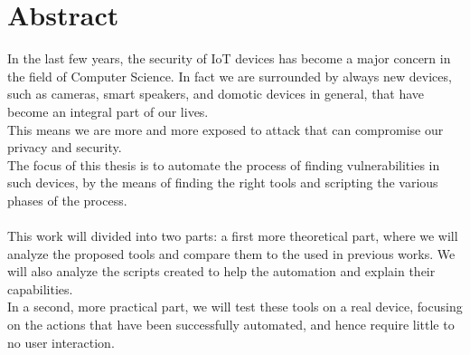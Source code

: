 \chapter*{Abstract} %
\label{abtract}


In the last few years, the security of IoT devices has become a major concern
in the field of Computer Science. In fact we are surrounded by always
new devices, such as cameras, smart speakers, and domotic devices in general,
that have become an integral part of our lives. \\
This means we are more and more exposed to attack that can compromise our
privacy and security. \\
The focus of this thesis is to automate the process of finding vulnerabilities
in such devices, by the means of finding the right tools and scripting the
various phases of the process. \\\\
This work will divided into two parts: a first more theoretical part, where
we will analyze the proposed tools and compare them to the used in previous works.
We will also analyze the scripts created to help the automation and explain their capabilities. \\
In a second, more practical part, we will test these tools on a real device,
focusing on the actions that have been successfully automated, and hence require
little to no user interaction. \\
\newpage